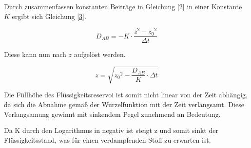 Durch zusammenfassen konstanten Beiträge in Gleichung \ref{2} in einer Konstante $K$ ergibt sich Gleichung \ref{3}.

\begin {equation}
D_{AB}=-K\cdot\frac{z^2-{z_0}^2}{\Delta t} 
\end{equation}

Diese kann nun nach $z$ aufgelöst werden.

\begin {equation}
z=\sqrt{{z_0}^2-\frac{D_{AB}}{K}\cdot\Delta t} 
\end{equation}


Die Füllhöhe des Flüssigkeitsreservoi ist somit nicht linear von der Zeit abhängig, da sich die Abnahme gemäß der Wurzelfunktion mit der Zeit verlangsamt. Diese Verlangsamung gewinnt mit sinkendem Pegel zunehmend an Bedeutung.

Da K durch den Logarithmus in negativ ist steigt z und somit sinkt der Flüssigkeitsstand, was für einen verdampfenden Stoff zu erwarten ist.






